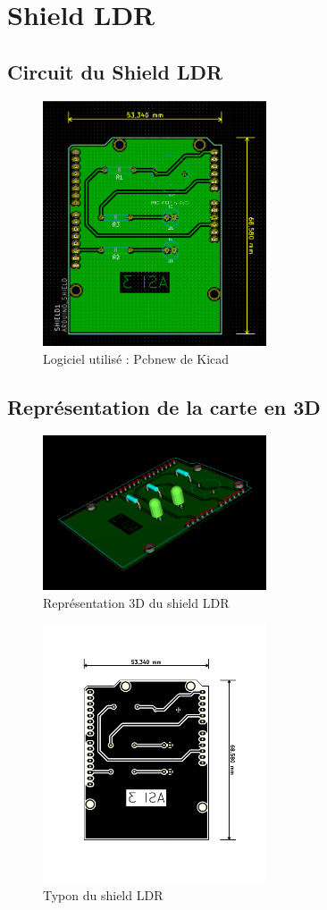 \section{Shield LDR}
\subsection{Circuit du Shield LDR}
\begin{figure}[H]
	\centering
	\includegraphics[width=250px]{images/Apercu.png}
	\caption{Logiciel utilisé : Pcbnew de Kicad}
\end{figure}
\newpage
\subsection{Représentation de la carte en 3D}
\begin{figure}[H]
	\centering
	\includegraphics[width=250px]{images/3DLDR.png}
	\caption{Représentation 3D du shield LDR}
\end{figure}
\begin{figure}[H]
	\centering
	\includegraphics[width=250px]{images/typonLDR.png}
	\caption{Typon du shield LDR}
\end{figure}

